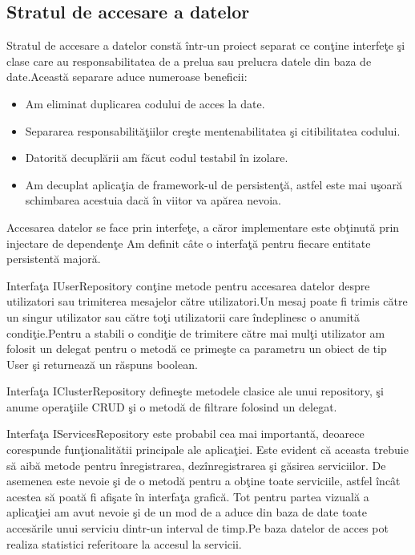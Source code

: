 \documentclass[a4paper,12pt]{report}
\begin{document}
\pagebreak

\subsection{Stratul de accesare a datelor}

Stratul de accesare a datelor const\u a \^intr-un proiect separat ce con\c tine interfe\c te \c si clase 
 care au responsabilitatea de a prelua sau prelucra datele din baza de date.Aceast\u a separare aduce numeroase
 beneficii:
 \begin{itemize}
	 \item Am eliminat duplicarea codului de acces la date.
	 \item Separarea responsabilit\u a\c tiilor cre\c ste mentenabilitatea \c si citibilitatea codului.
	 \item Datorit\u a decupl\u arii am f\u acut codul testabil \^in izolare.
	 \item Am decuplat aplica\c tia de framework-ul de persisten\c t\u a, astfel este mai u\c soar\u a schimbarea
	 	acestuia dac\u a \^in viitor va ap\u area nevoia. 
 \end{itemize}
 
Accesarea datelor se face prin interfe\c te, a c\u aror implementare este ob\c tinut\u a prin injectare de dependen\c te
Am definit c\^ate o interfa\c t\u a pentru fiecare entitate persistent\u a major\u a.

Interfa\c ta IUserRepository con\c tine 
metode pentru accesarea datelor despre utilizatori sau trimiterea mesajelor c\u atre utilizatori.Un mesaj poate fi trimis c\u atre 
un singur utilizator sau c\u atre to\c ti utilizatorii care \^indeplinesc o anumit\u a condi\c tie.Pentru a stabili o condi\c tie 
de trimitere c\u atre mai mul\c ti utilizator am folosit un delegat pentru o metod\u a ce prime\c ste ca parametru un obiect de tip 
User \c si returneaz\u a un r\u aspuns boolean.

Interfa\c ta IClusterRepository define\c ste metodele clasice ale unui repository, \c si anume opera\c tiile CRUD \c si o metod\u a de
filtrare folosind un delegat.

Interfa\c ta IServicesRepository este probabil cea mai important\u a, deoarece corespunde fun\c tionalit\u atii principale ale aplica\c tiei.
Este evident c\u a aceasta trebuie s\u a aib\u a metode pentru \^inregistrarea, dez\^inregistrarea \c si g\u asirea serviciilor.
De asemenea este nevoie \c si de o metod\u a pentru a ob\c tine toate serviciile, astfel \^inc\^at acestea s\u a poat\u a fi 
afi\c sate \^in interfa\c ta grafic\u a. Tot pentru partea vizual\u a a aplica\c tiei am avut nevoie \c si de un mod de a aduce 
din baza de date toate acces\u arile unui serviciu dintr-un interval de timp.Pe baza datelor de acces pot realiza statistici referitoare
la accesul la servicii.
\end{document}
